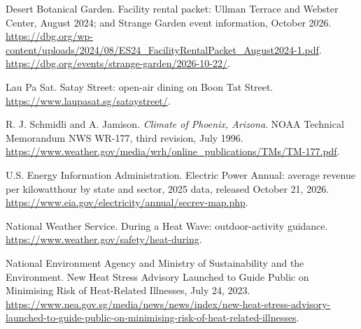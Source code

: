 Desert Botanical Garden. Facility rental packet: Ullman Terrace and Webster Center, August 2024; and Strange Garden event information, October 2026.
\url{https://dbg.org/wp-content/uploads/2024/08/ES24_FacilityRentalPacket_August2024-1.pdf}.
\url{https://dbg.org/events/strange-garden/2026-10-22/}.


Lau Pa Sat. Satay Street: open-air dining on Boon Tat Street.
\url{https://www.laupasat.sg/sataystreet/}.


R. J. Schmidli and A. Jamison. \emph{Climate of Phoenix, Arizona}.
NOAA Technical Memorandum NWS WR-177, third revision, July 1996.
\url{https://www.weather.gov/media/wrh/online_publications/TMs/TM-177.pdf}.


U.S. Energy Information Administration. Electric Power Annual: average revenue per kilowatthour by state and sector, 2025 data, released October 21, 2026.
\url{https://www.eia.gov/electricity/annual/secrev-map.php}.


National Weather Service. During a Heat Wave: outdoor-activity guidance.
\url{https://www.weather.gov/safety/heat-during}.


National Environment Agency and Ministry of Sustainability and the Environment.
New Heat Stress Advisory Launched to Guide Public on Minimising Risk of Heat-Related Illnesses, July 24, 2023.
\url{https://www.nea.gov.sg/media/news/news/index/new-heat-stress-advisory-launched-to-guide-public-on-minimising-risk-of-heat-related-illnesses}.

